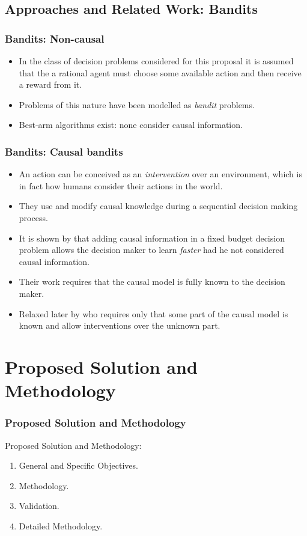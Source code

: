 \documentclass{beamer}
\theoremstyle{plain}
\begin{document}
\subsection{Approaches and Related Work: Bandits}
\begin{frame}
\frametitle{Bandits: Non-causal}
\begin{itemize}
\item In the class of decision problems considered for this proposal it is assumed that the a rational agent must choose some available action and then receive a reward from it.
\item Problems of this nature have been modelled as \textit{bandit} problems.
\item Best-arm algorithms exist: none consider causal information.
\end{itemize}
\end{frame}
\begin{frame}
\frametitle{Bandits: Causal bandits}
\begin{itemize}
\item An action can be conceived as an \textit{intervention} over an environment, which is in fact how humans consider their actions in the world.
\item They use and modify causal knowledge during a sequential decision making process.
\item It is shown by \cite{lattimoreNIPS2016} that adding causal information in a fixed budget decision problem allows the decision maker to learn \textit{faster} had he not considered causal information.
\item Their work requires that the causal model is fully known to the decision maker.
\item Relaxed later by \cite{sen2017identifying} who requires only that some part of the causal model is known and allow interventions over the unknown part. 
\end{itemize}
\end{frame}
\section{Proposed Solution and Methodology}
\begin{frame}
\frametitle{Proposed Solution and Methodology}
Proposed Solution and Methodology:
\begin{enumerate}
\item General and Specific Objectives.
\item Methodology.
\item Validation.
\item Detailed Methodology.
\end{enumerate}
\end{frame}
\end{document}
